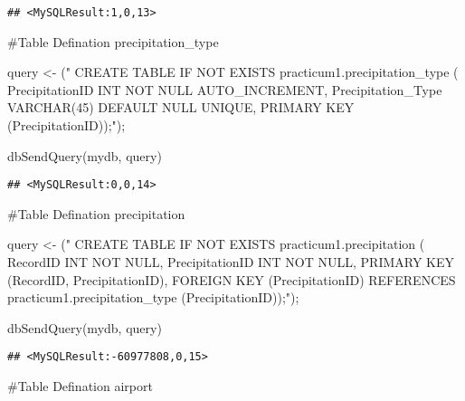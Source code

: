 \documentclass[
]{article}
\newenvironment{Shaded}{\begin{snugshade}}{\end{snugshade}}
\newcommand{\FunctionTok}[1]{\textcolor[rgb]{0.00,0.00,0.00}{#1}}
\newcommand{\NormalTok}[1]{#1}
\newcommand{\OtherTok}[1]{\textcolor[rgb]{0.56,0.35,0.01}{#1}}
\newcommand{\StringTok}[1]{\textcolor[rgb]{0.31,0.60,0.02}{#1}}
\begin{document}
\begin{verbatim}
## <MySQLResult:1,0,13>
\end{verbatim}

\#Table Defination precipitation\_type

\begin{Shaded}
\begin{Highlighting}[]
\NormalTok{query }\OtherTok{\textless{}{-}}\NormalTok{ (}\StringTok{"}
\StringTok{  CREATE TABLE IF NOT EXISTS practicum1.\textasciigrave{}precipitation\_type\textasciigrave{} (}
\StringTok{  \textasciigrave{}PrecipitationID\textasciigrave{} INT NOT NULL AUTO\_INCREMENT,}
\StringTok{  \textasciigrave{}Precipitation\_Type\textasciigrave{} VARCHAR(45) DEFAULT \textquotesingle{} \textquotesingle{} NULL UNIQUE,}
\StringTok{  PRIMARY KEY (\textasciigrave{}PrecipitationID\textasciigrave{}));"}\NormalTok{);}

\FunctionTok{dbSendQuery}\NormalTok{(mydb, query)}
\end{Highlighting}
\end{Shaded}

\begin{verbatim}
## <MySQLResult:0,0,14>
\end{verbatim}

\#Table Defination precipitation

\begin{Shaded}
\begin{Highlighting}[]
\NormalTok{query }\OtherTok{\textless{}{-}}\NormalTok{ (}\StringTok{"}
\StringTok{  CREATE TABLE IF NOT EXISTS practicum1.\textasciigrave{}precipitation\textasciigrave{} (}
\StringTok{  \textasciigrave{}RecordID\textasciigrave{} INT NOT NULL,}
\StringTok{  \textasciigrave{}PrecipitationID\textasciigrave{} INT NOT NULL,}
\StringTok{  PRIMARY KEY (\textasciigrave{}RecordID\textasciigrave{}, \textasciigrave{}PrecipitationID\textasciigrave{}),}
\StringTok{  FOREIGN KEY (\textasciigrave{}PrecipitationID\textasciigrave{}) REFERENCES practicum1.\textasciigrave{}precipitation\_type\textasciigrave{} (\textasciigrave{}PrecipitationID\textasciigrave{}));"}\NormalTok{);}

\FunctionTok{dbSendQuery}\NormalTok{(mydb, query)}
\end{Highlighting}
\end{Shaded}

\begin{verbatim}
## <MySQLResult:-60977808,0,15>
\end{verbatim}

\#Table Defination airport
\end{document}
